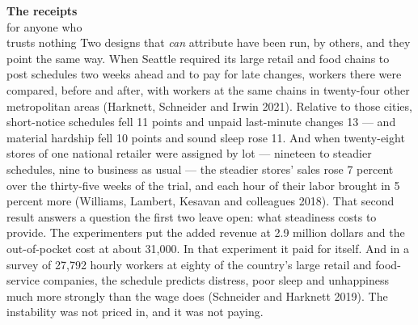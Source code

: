 \begin{receipts}{\textbf{The receipts}\\for anyone who\\trusts nothing}
Two designs that \emph{can} attribute have been run, by others, and they
point the same way. When Seattle required its large retail and food
chains to post schedules two weeks ahead and to pay for late changes,
workers there were compared, before and after, with workers at the
same chains in twenty-four other metropolitan areas (Harknett,
Schneider and Irwin 2021). Relative to those cities, short-notice
schedules fell 11 points and unpaid last-minute changes 13 --- and
material hardship fell 10 points and sound sleep rose 11. And when
twenty-eight stores of one national retailer were assigned by lot ---
nineteen to steadier schedules, nine to business as usual --- the
steadier stores' sales rose 7 percent over the thirty-five weeks of
the trial, and each hour of their labor brought in 5 percent more
(Williams, Lambert, Kesavan and colleagues 2018). That second result
answers a question the first two leave open: what steadiness costs to
provide. The experimenters put the added revenue at 2.9 million
dollars and the out-of-pocket cost at about 31,000. In that experiment
it paid for itself. And in a survey of 27,792 hourly workers at eighty of the country's
large retail and food-service companies, the schedule predicts
distress, poor sleep and unhappiness much more strongly than the wage
does
(Schneider and Harknett 2019). The instability was not priced in, and
it was not paying.

\end{receipts}

